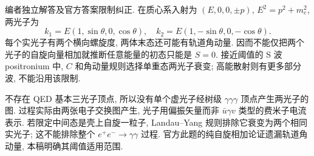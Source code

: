 \begin{solution}
编者独立解答及官方答案限制纠正. 在质心系入射为 $(E,0,0,\pm p)$, $E^2=p^2+m_e^2$, 两光子为
\begin{equation*}
 k_1=E(1,\sin\theta,0,\cos\theta),\quad k_2=E(1,-\sin\theta,0,-\cos\theta).
\end{equation*} 每个实光子有两个横向螺旋度, 两体末态还可能有轨道角动量. 因而不能仅把两个光子的自旋向量相加就推断任意能量的初态只能是 $S=0$. 接近阈值的 S 波 positronium 中, $C$ 和角动量规则选择单重态两光子衰变; 高能散射则有更多部分波, 不能沿用该限制.

不存在 QED 基本三光子顶点, 所以没有单个虚光子经树级 $\gamma\gamma\gamma$ 顶点产生两光子的图. 过程实际由两张电子交换图产生, 光子用偏振矢量而非 $\bar u\gamma v$ 类型的费米子电流表示. 若限定中间态是壳上自旋一粒子, Landau--Yang 规则排除它衰变为两个相同实光子; 这不能排除整个 $e^+e^-\to\gamma\gamma$ 过程. 官方此题的纯自旋相加论证遗漏轨道角动量, 本稿明确其阈值适用范围.
\end{solution}
